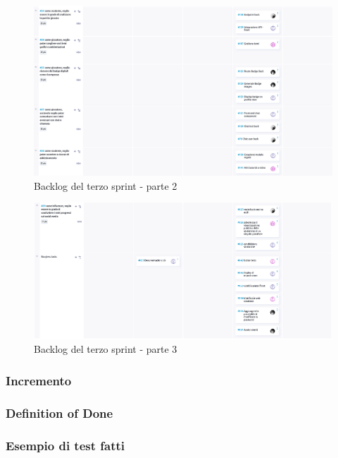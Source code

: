 \documentclass{article}
\begin{document}
\begin{figure}[H]
    \centering
    \includegraphics[width=1\textwidth]{backlog3_2}
    \caption{Backlog del terzo sprint - parte 2}
    \label{fig:backlog3_2}
\end{figure}

\begin{figure}[H]
    \centering
    \includegraphics[width=1\textwidth]{backlog3_3}
    \caption{Backlog del terzo sprint - parte 3}
    \label{fig:backlog3_3}
\end{figure}

\subsubsection{Incremento}

\subsubsection{Definition of Done}

\subsubsection{Esempio di test fatti}
\end{document}

